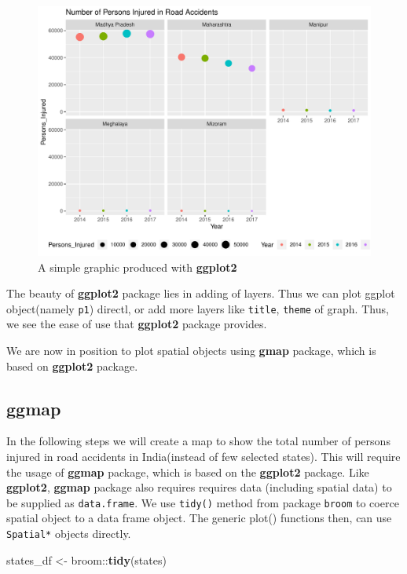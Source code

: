 \documentclass[]{article}
\newenvironment{Shaded}{}{}
\newcommand{\KeywordTok}[1]{\textcolor[rgb]{0.00,0.44,0.13}{\textbf{#1}}}
\newcommand{\NormalTok}[1]{#1}
\newcommand{\OperatorTok}[1]{\textcolor[rgb]{0.40,0.40,0.40}{#1}}
\newcommand{\StringTok}[1]{\textcolor[rgb]{0.25,0.44,0.63}{#1}}
\begin{document}
\begin{figure}
\centering
\includegraphics{TutorialNotebook_files/figure-latex/unnamed-chunk-21-1.pdf}
\caption{A simple graphic produced with \textbf{ggplot2}}
\end{figure}

The beauty of \textbf{ggplot2} package lies in adding of layers. Thus we
can plot ggplot object(namely \texttt{p1}) directl, or add more layers
like \texttt{title}, \texttt{theme} of graph. Thus, we see the ease of
use that \textbf{ggplot2} package provides.

We are now in position to plot spatial objects using \textbf{gmap}
package, which is based on \textbf{ggplot2} package.

\hypertarget{ggmap}{%
\subsection{ggmap}\label{ggmap}}

In the following steps we will create a map to show the total number of
persons injured in road accidents in India(instead of few selected
states). This will require the usage of \textbf{ggmap} package, which is
based on the \textbf{ggplot2} package. Like \textbf{ggplot2},
\textbf{ggmap} package also requires requires data (including spatial
data) to be supplied as \texttt{data.frame}. We use \texttt{tidy()}
method from package \texttt{broom} to coerce spatial object to a data
frame object. The generic plot() functions then, can use
\texttt{Spatial*} objects directly.

\begin{Shaded}
\begin{Highlighting}[]
\NormalTok{states_df <-}\StringTok{ }\NormalTok{broom}\OperatorTok{::}\KeywordTok{tidy}\NormalTok{(states)}
\end{Highlighting}
\end{Shaded}
\end{document}
